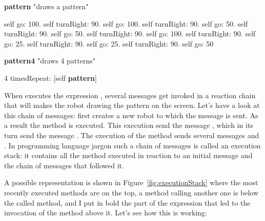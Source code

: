 \begin{minipage}[t]{8cm}
\begin{method}
\textbf{pattern}
   "draws a pattern"

   self go: 100.
   self turnRight: 90.
   self go: 100.
   self turnRight: 90.
   self go: 50.
   self turnRight: 90.
   self go: 50.
   self turnRight: 90.
   self go: 100.
   self turnRight: 90.
   self go: 25.
   self turnRight: 90.
   self go: 25.
   self turnRight: 90.
   self go: 50
\end{method}
\end{minipage}
\begin{minipage}[t]{8cm}
\begin{method}\label{src:mth:pattern43}
\textbf{pattern4}
  "draws 4 patterns"

  4 timesRepeat: [self \textbf{pattern}]
\end{method}
\end{minipage}


When \sq executes the expression , several messages get invoked in a reaction chain that will makes the robot drawing the pattern on the screen. Let's have a look at this chain of messages: first  creates a new robot to which the message  is sent. As a result the method  is executed. This execution send the message , which in its turn send the message . The execution of the method  sends several messages  and . In programming language jargon such a chain of messages is called
an execution stack: it contains all the method executed in reaction to an initial message and the chain of messages that followed it.

A possible representation is shown in Figure~\ref{fig:executionStack} where the most recently executed methods are on the top,  a method calling another one is below the called method, and I put in bold the part of the expression that led to the invocation of the method above it. Let's see how this is working:


